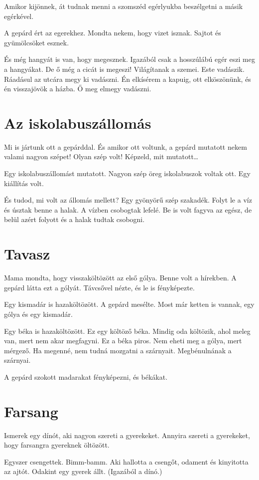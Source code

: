 \documentclass[12pt]{memoir}
\begin{document}
Amikor kijönnek, át tudnak menni a szomszéd egérlyukba beszélgetni a másik
egérkével.

A gepárd ért az egerekhez. Mondta nekem, hogy vizet isznak. Sajtot és
gyümölcsöket esznek.

És még hangyát is van, hogy megesznek. Igazából csak a hosszúlábú egér eszi meg
a hangyákat. De ő még a cicát is megeszi! Világítanak a szemei. Este vadászik.
Ráadásul az utcára megy ki vadászni. Én elkísérem a kapuig, ott elköszönünk, és
én visszajövök a házba. Ő meg elmegy vadászni.
\cleartoverso


\section{Az iskolabuszállomás}
Mi is jártunk ott a gepárddal. És amikor ott voltunk, a gepárd mutatott nekem
valami nagyon szépet! Olyan szép volt! Képzeld, mit mutatott…

Egy iskolabuszállomást mutatott. Nagyon szép öreg iskolabuszok voltak ott. Egy
kiállítás volt.

És tudod, mi volt az állomás mellett? Egy gyönyörű szép szakadék. Folyt le a
víz és úsztak benne a halak. A vízben csobogtak lefelé. Be is volt fagyva az
egész, de belül azért folyott és a halak tudtak csobogni.
\cleartoverso


\section{Tavasz}
Mama mondta, hogy visszaköltözött az első gólya. Benne volt a hírekben. A
gepárd látta ezt a gólyát. Távcsővel nézte, és le is fényképezte.

Egy kismadár is hazaköltözött. A gepárd mesélte. Most már ketten is vannak, egy
gólya és egy kismadár.

Egy béka is hazaköltözött. Ez egy költöző béka. Mindig oda költözik, ahol meleg
van, mert nem akar megfagyni. Ez a béka piros. Nem eheti meg a gólya, mert
mérgező. Ha megenné, nem tudná mozgatni a szárnyait. Megbénulnának a szárnyai.

A gepárd szokott madarakat fényképezni, és békákat.
\cleartoverso


\section{Farsang}
Ismerek egy dínót, aki nagyon szereti a gyerekeket. Annyira szereti a
gyerekeket, hogy farsangra gyereknek öltözött.

Egyszer csengettek. Bimm-bamm. Aki hallotta a csengőt, odament és kinyitotta az
ajtót. Odakint egy gyerek állt. (Igazából a dínó.)
\cleartoverso
\end{document}
